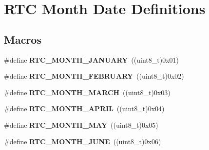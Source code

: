 \hypertarget{group___r_t_c___month___date___definitions}{}\section{R\+TC Month Date Definitions}
\label{group___r_t_c___month___date___definitions}
\subsection*{Macros}
\begin{DoxyCompactItemize}
\item 
\mbox{\label{group___r_t_c___month___date___definitions_gabc94e7ef324c7d181c54302938138aab}} 
\#define {\bfseries R\+T\+C\+\_\+\+M\+O\+N\+T\+H\+\_\+\+J\+A\+N\+U\+A\+RY}~((uint8\+\_\+t)0x01)
\item 
\mbox{\label{group___r_t_c___month___date___definitions_gadcec3575c8a670a948a3929a2e9f1b6b}} 
\#define {\bfseries R\+T\+C\+\_\+\+M\+O\+N\+T\+H\+\_\+\+F\+E\+B\+R\+U\+A\+RY}~((uint8\+\_\+t)0x02)
\item 
\mbox{\label{group___r_t_c___month___date___definitions_gaa0ebba4b64b5591cd434b076c922a164}} 
\#define {\bfseries R\+T\+C\+\_\+\+M\+O\+N\+T\+H\+\_\+\+M\+A\+R\+CH}~((uint8\+\_\+t)0x03)
\item 
\mbox{\label{group___r_t_c___month___date___definitions_gac15a5a2164c0e536c579e7f16bd9f1b4}} 
\#define {\bfseries R\+T\+C\+\_\+\+M\+O\+N\+T\+H\+\_\+\+A\+P\+R\+IL}~((uint8\+\_\+t)0x04)
\item 
\mbox{\label{group___r_t_c___month___date___definitions_ga44814b4fb8311b5842675769937129ec}} 
\#define {\bfseries R\+T\+C\+\_\+\+M\+O\+N\+T\+H\+\_\+\+M\+AY}~((uint8\+\_\+t)0x05)
\item 
\mbox{\label{group___r_t_c___month___date___definitions_gad3439b4b8c19720c01ef6c35d9bb99fa}} 
\#define {\bfseries R\+T\+C\+\_\+\+M\+O\+N\+T\+H\+\_\+\+J\+U\+NE}~((uint8\+\_\+t)0x06)
\item 

\end{DoxyCompactItemize}
